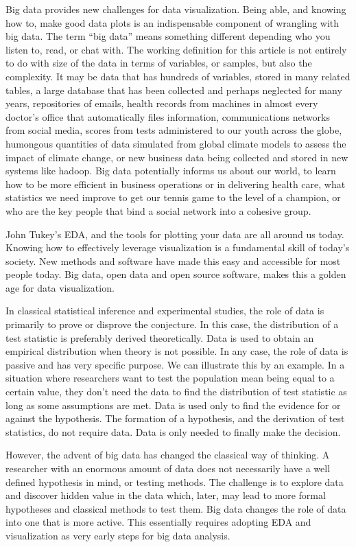 \documentclass[11pt]{article}
\begin{document}
\noindent Big data provides new challenges for data visualization. Being able, and knowing how to, make good data plots is an indispensable component of wrangling with big data. The term ``big data'' means something different depending who you listen to, read, or chat with. The working definition for this article is not entirely to do with size of the data in terms of variables, or samples, but also the complexity. It may be data that has hundreds of variables, stored in many related tables, a large database that has been collected and perhaps neglected for many years, repositories of emails, health records from machines in almost every doctor's office that automatically files information, communications networks from social media, scores from tests administered to our youth across the globe, humongous quantities of data simulated from global climate models to assess the impact of climate change, or new business data being collected and stored in new systems like hadoop. Big data potentially informs  us about our world, to learn how to be more efficient in business operations or in delivering health care, what statistics we need improve to get our tennis game to the level of a champion, or who are the key people that bind a social network into a cohesive group.

John Tukey's EDA, and the tools for plotting your data are all around us today. Knowing how to effectively leverage visualization is a fundamental skill of today's society. New methods and software have made this easy and accessible for most people today. Big data, open data and open source software, makes this a golden age for data visualization.

In classical statistical inference and experimental studies, the role of data is primarily to prove or disprove the conjecture. In this case, the distribution of a test statistic is preferably derived theoretically. Data is used to obtain an empirical distribution when theory is not possible. In any case, the role of data is passive and has very specific purpose. We can illustrate this by an example. In a situation where researchers want to test the population mean being equal to a certain value, they don't need the data to find the distribution of test statistic as long as some assumptions are met. Data is used only to find the evidence for or against the hypothesis. The formation of a hypothesis, and the derivation of test statistics, do not require data. Data is only needed to finally make the decision.

However, the advent of big data has changed the classical way of thinking. A researcher with an enormous amount of data does not necessarily have a well defined hypothesis in mind, or testing methods. The challenge is to explore data and discover hidden value in the data which, later, may lead to more formal hypotheses and classical methods to test them. Big data changes the role of data into one that is more active. This essentially requires adopting EDA and visualization as very early steps for big data analysis.
\end{document}
